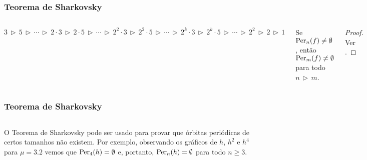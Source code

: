 
\begin{frame}
\vspace{5pt}
\frametitle{Teorema de Sharkovsky}
\begin{columns}
\column{\dimexpr\paperwidth-15pt}

\begin{definition}
$3 \, \triangleright \, 5 
\, \triangleright \, \cdots \, \triangleright \,
2 \cdot 3 \, \triangleright \, 2 \cdot 5 
\, \triangleright \, \cdots \, \triangleright \,
2^2 \cdot 3 \, \triangleright \, 2^2 \cdot 5
\, \triangleright \, \cdots \, \triangleright \,
2^k \cdot 3 \, \triangleright \, 2^k \cdot 5
\, \triangleright \, \cdots \, \triangleright \,
2^2 \, \triangleright \, 2 \, \triangleright \, 1$
\end{definition}
\vspace{15pt}
\begin{theorem}[Sharkovsky]
Se $\operatorname{Per}_n(f) \neq \emptyset$, então $\operatorname{Per}_m(f) \neq \emptyset$ para todo $n \, \triangleright \, m$.
\end{theorem}

\begin{proof}
Ver \cite{burns}.
\end{proof}

\end{columns}
\end{frame}


\begin{frame}
\vspace{5pt}
\frametitle{Teorema de Sharkovsky}
\begin{columns}
\column{\dimexpr\paperwidth-15pt}

O Teorema de Sharkovsky pode ser usado para provar que órbitas periódicas de certos tamanhos não existem. Por exemplo, observando os gráficos de $h$, $h^2$ e $h^4$ para $\mu = 3.2$ vemos que $\operatorname{Per}_4(h) = \emptyset$ e, portanto, $\operatorname{Per}_n(h) = \emptyset$ para todo $n \geq 3$.

\end{columns}
\end{frame}



